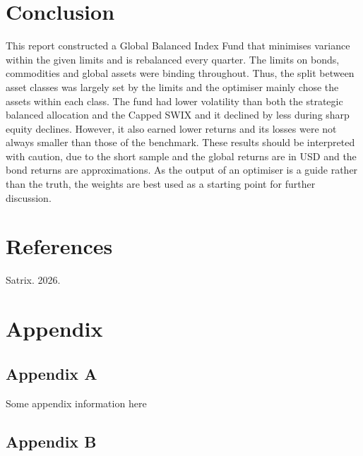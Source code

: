 \documentclass[11pt,preprint]{elsarticle}
\numberwithin{equation}{section}
\numberwithin{figure}{section}
\numberwithin{table}{section}
\newlength{\cslhangindent}
\newenvironment{CSLReferences}[2] %
{\begin{list}{}{%
	\setlength{\itemindent}{0pt}
	\setlength{\leftmargin}{0pt}
	\setlength{\parsep}{0pt}
	\ifodd #1
	\setlength{\leftmargin}{\cslhangindent}
	\setlength{\itemindent}{-1\cslhangindent}
	\fi
	\setlength{\itemsep}{#2\baselineskip}}}
{\end{list}}
\begin{document}
\section{\texorpdfstring{Conclusion
\label{Conclusion}}{Conclusion }}\label{conclusion}

This report constructed a Global Balanced Index Fund that minimises
variance within the given limits and is rebalanced every quarter. The
limits on bonds, commodities and global assets were binding throughout.
Thus, the split between asset classes was largely set by the limits and
the optimiser mainly chose the assets within each class. The fund had
lower volatility than both the strategic balanced allocation and the
Capped SWIX and it declined by less during sharp equity declines.
However, it also earned lower returns and its losses were not always
smaller than those of the benchmark. These results should be interpreted
with caution, due to the short sample and the global returns are in USD
and the bond returns are approximations. As the output of an optimiser
is a guide rather than the truth, the weights are best used as a
starting point for further discussion.

\newpage

\section*{References}\label{references}

\protect{}\label{refs}
\begin{CSLReferences}{1}{1}
Satrix. 2026.

\end{CSLReferences}

\section*{Appendix}\label{appendix}

\subsection*{Appendix A}\label{appendix-a}

Some appendix information here

\subsection*{Appendix B}\label{appendix-b}


\end{document}
